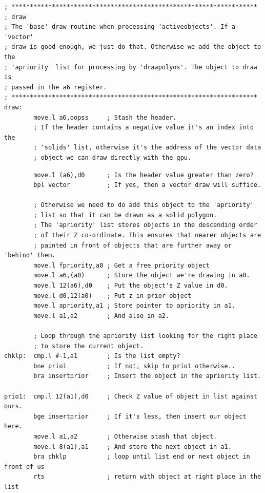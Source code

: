 \begin{lstlisting}
; *******************************************************************
; draw
; The 'base' draw routine when processing 'activeobjects'. If a 'vector'
; draw is good enough, we just do that. Otherwise we add the object to the
; 'apriority' list for processing by 'drawpolyos'. The object to draw is
; passed in the a6 register.
; *******************************************************************
draw:
        move.l a6,oopss     ; Stash the header.
        ; If the header contains a negative value it's an index into the
        ; 'solids' list, otherwise it's the address of the vector data
        ; object we can draw directly with the gpu.
\end{lstlisting}
\begin{lstlisting}
        move.l (a6),d0      ; Is the header value greater than zero?
        bpl vector          ; If yes, then a vector draw will suffice.
    
        ; Otherwise we need to do add this object to the 'apriority'
        ; list so that it can be drawn as a solid polygon.
        ; The 'apriority' list stores objects in the descending order
        ; of their Z co-ordinate. This ensures that nearer objects are
        ; painted in front of objects that are further away or 'behind' them.
        move.l fpriority,a0 ; Get a free priority object
        move.l a6,(a0)      ; Store the object we're drawing in a0.
        move.l 12(a6),d0    ; Put the object's Z value in d0.
        move.l d0,12(a0)    ; Put z in prior object
        move.l apriority,a1 ; Store pointer to apriority in a1.
        move.l a1,a2        ; And also in a2.

        ; Loop through the apriority list looking for the right place
        ; to store the current object.
chklp:  cmp.l #-1,a1        ; Is the list empty?
        bne prio1           ; If not, skip to prio1 otherwise..
        bra insertprior     ; Insert the object in the apriority list.
    
prio1:  cmp.l 12(a1),d0     ; Check Z value of object in list against ours. 
        bge insertprior     ; If it's less, then insert our object here.
        move.l a1,a2        ; Otherwise stash that object.
        move.l 8(a1),a1     ; And store the next object in a1.
        bra chklp           ; loop until list end or next object in front of us
        rts                 ; return with object at right place in the list
\end{lstlisting}

